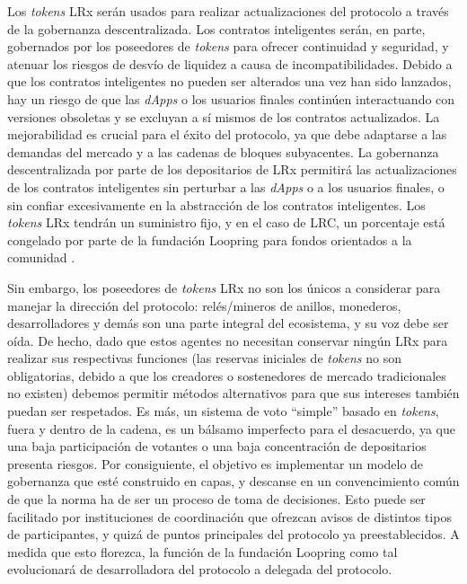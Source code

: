 \documentclass[UTF8,nofonts]{article}
\begin{document}
\begin{multicols}{2}
Los \textit{tokens} LRx serán usados para realizar actualizaciones del protocolo a través de la gobernanza descentralizada. Los contratos inteligentes serán, en parte, gobernados por los poseedores de \textit{tokens} para ofrecer continuidad y seguridad, y atenuar los riesgos de desvío de liquidez a causa de incompatibilidades. Debido a que los contratos inteligentes no pueden ser alterados una vez han sido lanzados, hay un riesgo de que las \textit{dApps} o los usuarios finales continúen interactuando con versiones obsoletas y se excluyan a sí mismos de los contratos actualizados. La mejorabilidad es crucial para el éxito del protocolo, ya que debe adaptarse a las demandas del mercado y a las cadenas de bloques subyacentes. La gobernanza descentralizada por parte de los depositarios de LRx permitirá las actualizaciones de los contratos inteligentes sin perturbar a las \textit{dApps} o a los usuarios finales, o sin confiar excesivamente en la abstracción de los contratos inteligentes. Los \textit{tokens} LRx tendrán un suministro fijo, y en el caso de LRC, un porcentaje está congelado por parte de la fundación Loopring para fondos orientados a la comunidad \cite{LRCtokendoc}.

Sin embargo, los poseedores de \textit{tokens} LRx no son los únicos a considerar para manejar la dirección del protocolo: relés/mineros de anillos, monederos, desarrolladores y demás son una parte integral del ecosistema, y su voz debe ser oída. De hecho, dado que estos agentes no necesitan conservar ningún LRx para realizar sus respectivas funciones (las reservas iniciales de \textit{tokens} no son obligatorias, debido a que los creadores o sostenedores de mercado tradicionales no existen) debemos permitir métodos alternativos para que sus intereses también puedan ser respetados. Es más, un sistema de voto \enquote{simple} basado en \textit{tokens}, fuera y dentro de la cadena, es un bálsamo imperfecto para el desacuerdo, ya que una baja participación de votantes o una baja concentración de depositarios presenta riesgos. Por consiguiente, el objetivo es implementar un modelo de gobernanza que esté construido en capas, y descanse en un convencimiento común de que la norma ha de ser un proceso de toma de decisiones. Esto puede ser facilitado por instituciones de coordinación que ofrezcan avisos de distintos tipos de participantes, y quizá de puntos principales del protocolo ya preestablecidos. A medida que esto florezca, la función de la fundación Loopring como tal evolucionará de desarrolladora del protocolo a delegada del protocolo.


\end{multicols}
\end{document}
